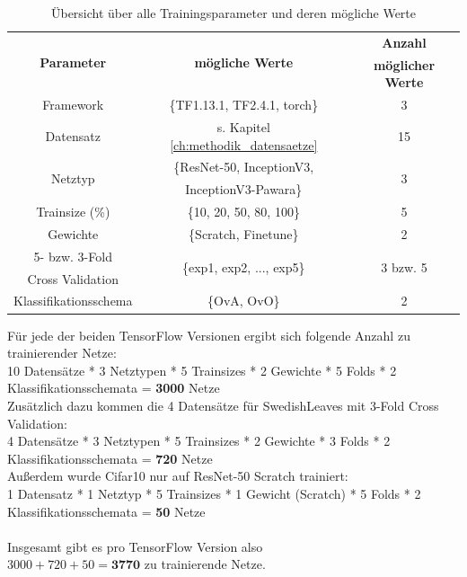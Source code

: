 \begin{table}[H]
\centering
\begin{tabular}{|c|c|c|}
\hline 
\multirow{2}{*}{\textbf{Parameter}} & \multirow{2}{*}{\textbf{mögliche Werte}} & \textbf{Anzahl} \\ 
& & \textbf{möglicher Werte} \\
\hline 
Framework & \{TF1.13.1, TF2.4.1, torch\} & 3\\
\hline
Datensatz & s. Kapitel \ref{ch:methodik_datensaetze} & 15\\
\hline 
\multirow{2}{*}{Netztyp} & \{ResNet-50, InceptionV3, & \multirow{2}{*}{3} \\
 & InceptionV3-Pawara\} & \\
\hline
Trainsize (\%) & \{10, 20, 50, 80, 100\}& 5 \\
\hline
Gewichte & \{Scratch, Finetune\} & 2 \\
\hline
5- bzw. 3-Fold & \multirow{2}{*}{\{exp1, exp2, ..., exp5\}} & \multirow{2}{*}{3 bzw. 5} \\
Cross Validation & & \\
\hline
Klassifikationsschema & \{OvA, OvO\} & 2 \\
\hline
\end{tabular} 
\caption{Übersicht über alle Trainingsparameter und deren mögliche Werte}
\label{tab:parameterUebersicht}
\end{table}

Für jede der beiden TensorFlow \cite{tensorflow} Versionen ergibt sich folgende Anzahl zu trainierender Netze:\\
\begin{adjustbox}{width=\textwidth, center}
10 Datensätze * 3 Netztypen * 5 Trainsizes * 2 Gewichte * 5 Folds * 2 Klassifikationsschemata = \textbf{3000} Netze\\
\end{adjustbox}
Zusätzlich dazu kommen die 4 Datensätze für SwedishLeaves \cite{swedishLeaves} mit 3-Fold Cross Validation:\\
\begin{adjustbox}{width=\textwidth, center}
4 Datensätze * 3 Netztypen * 5 Trainsizes * 2 Gewichte * 3 Folds * 2 Klassifikationsschemata = \textbf{720} Netze\\
\end{adjustbox}
Außerdem wurde Cifar10 \cite{cifar10} nur auf ResNet-50 Scratch trainiert:\\
\begin{adjustbox}{width=\textwidth, center}
1 Datensatz * 1 Netztyp * 5 Trainsizes * 1 Gewicht (Scratch) * 5 Folds * 2 Klassifikationsschemata = \textbf{50} Netze\\
\end{adjustbox}
\\
Insgesamt gibt es pro TensorFlow \cite{tensorflow} Version also\\
$3000 + 720 + 50 = \textbf{3770}$ zu trainierende Netze.\\\\


